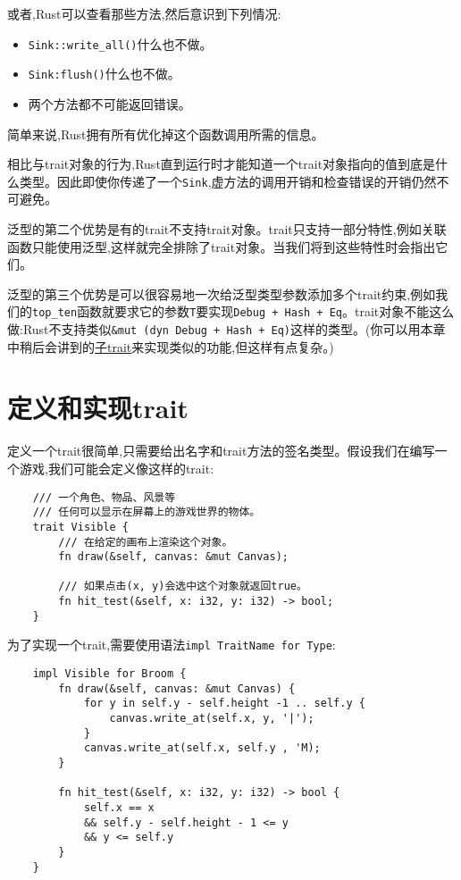 或者,Rust可以查看那些方法,然后意识到下列情况:
\begin{itemize}
    \item \texttt{Sink::write\_all()}什么也不做。
    \item \texttt{Sink:flush()}什么也不做。
    \item 两个方法都不可能返回错误。
\end{itemize}

简单来说,Rust拥有所有优化掉这个函数调用所需的信息。

相比与trait对象的行为,Rust直到运行时才能知道一个trait对象指向的值到底是什么类型。因此即使你传递了一个\texttt{Sink},虚方法的调用开销和检查错误的开销仍然不可避免。

泛型的第二个优势是有的trait不支持trait对象。trait只支持一部分特性,例如关联函数只能使用泛型,这样就完全排除了trait对象。当我们将到这些特性时会指出它们。

泛型的第三个优势是可以很容易地一次给泛型类型参数添加多个trait约束,例如我们的\texttt{top\_ten}函数就要求它的参数\texttt{T}要实现\texttt{Debug + Hash + Eq}。trait对象不能这么做:Rust不支持类似\texttt{\&mut (dyn Debug + Hash + Eq)}这样的类型。(你可以用本章中稍后会讲到的\hyperref[subtrait]{子trait}来实现类似的功能,但这样有点复杂。)

\section{定义和实现trait}

定义一个trait很简单,只需要给出名字和trait方法的签名类型。假设我们在编写一个游戏,我们可能会定义像这样的trait:
\begin{verbatim}
    /// 一个角色、物品、风景等
    /// 任何可以显示在屏幕上的游戏世界的物体。
    trait Visible {
        /// 在给定的画布上渲染这个对象。
        fn draw(&self, canvas: &mut Canvas);

        /// 如果点击(x, y)会选中这个对象就返回true。
        fn hit_test(&self, x: i32, y: i32) -> bool;
    }
\end{verbatim}

为了实现一个trait,需要使用语法\texttt{impl TraitName for Type}:
\begin{verbatim}
    impl Visible for Broom {
        fn draw(&self, canvas: &mut Canvas) {
            for y in self.y - self.height -1 .. self.y {
                canvas.write_at(self.x, y, '|');
            }
            canvas.write_at(self.x, self.y , 'M);
        }

        fn hit_test(&self, x: i32, y: i32) -> bool {
            self.x == x
            && self.y - self.height - 1 <= y
            && y <= self.y
        }
    }
\end{verbatim}

